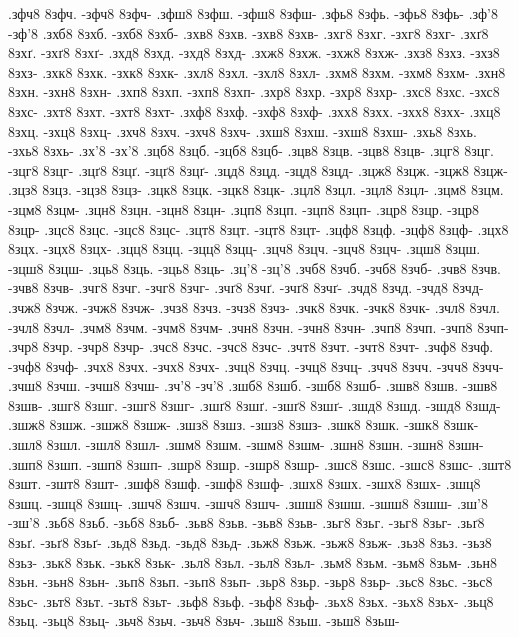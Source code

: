 {.зфч8 8зфч. -зфч8 8зфч-
.зфш8 8зфш. -зфш8 8зфш-
.зфь8 8зфь. -зфь8 8зфь-
.зф'8 -зф'8
.зхб8 8зхб. -зхб8 8зхб-
.зхв8 8зхв. -зхв8 8зхв-
.зхг8 8зхг. -зхг8 8зхг-
.зхґ8 8зхґ. -зхґ8 8зхґ-
.зхд8 8зхд. -зхд8 8зхд-
.зхж8 8зхж. -зхж8 8зхж-
.зхз8 8зхз. -зхз8 8зхз-
.зхк8 8зхк. -зхк8 8зхк-
.зхл8 8зхл. -зхл8 8зхл-
.зхм8 8зхм. -зхм8 8зхм-
.зхн8 8зхн. -зхн8 8зхн-
.зхп8 8зхп. -зхп8 8зхп-
.зхр8 8зхр. -зхр8 8зхр-
.зхс8 8зхс. -зхс8 8зхс-
.зхт8 8зхт. -зхт8 8зхт-
.зхф8 8зхф. -зхф8 8зхф-
.зхх8 8зхх. -зхх8 8зхх-
.зхц8 8зхц. -зхц8 8зхц-
.зхч8 8зхч. -зхч8 8зхч-
.зхш8 8зхш. -зхш8 8зхш-
.зхь8 8зхь. -зхь8 8зхь-
.зх'8 -зх'8
.зцб8 8зцб. -зцб8 8зцб-
.зцв8 8зцв. -зцв8 8зцв-
.зцг8 8зцг. -зцг8 8зцг-
.зцґ8 8зцґ. -зцґ8 8зцґ-
.зцд8 8зцд. -зцд8 8зцд-
.зцж8 8зцж. -зцж8 8зцж-
.зцз8 8зцз. -зцз8 8зцз-
.зцк8 8зцк. -зцк8 8зцк-
.зцл8 8зцл. -зцл8 8зцл-
.зцм8 8зцм. -зцм8 8зцм-
.зцн8 8зцн. -зцн8 8зцн-
.зцп8 8зцп. -зцп8 8зцп-
.зцр8 8зцр. -зцр8 8зцр-
.зцс8 8зцс. -зцс8 8зцс-
.зцт8 8зцт. -зцт8 8зцт-
.зцф8 8зцф. -зцф8 8зцф-
.зцх8 8зцх. -зцх8 8зцх-
.зцц8 8зцц. -зцц8 8зцц-
.зцч8 8зцч. -зцч8 8зцч-
.зцш8 8зцш. -зцш8 8зцш-
.зць8 8зць. -зць8 8зць-
.зц'8 -зц'8
.зчб8 8зчб. -зчб8 8зчб-
.зчв8 8зчв. -зчв8 8зчв-
.зчг8 8зчг. -зчг8 8зчг-
.зчґ8 8зчґ. -зчґ8 8зчґ-
.зчд8 8зчд. -зчд8 8зчд-
.зчж8 8зчж. -зчж8 8зчж-
.зчз8 8зчз. -зчз8 8зчз-
.зчк8 8зчк. -зчк8 8зчк-
.зчл8 8зчл. -зчл8 8зчл-
.зчм8 8зчм. -зчм8 8зчм-
.зчн8 8зчн. -зчн8 8зчн-
.зчп8 8зчп. -зчп8 8зчп-
.зчр8 8зчр. -зчр8 8зчр-
.зчс8 8зчс. -зчс8 8зчс-
.зчт8 8зчт. -зчт8 8зчт-
.зчф8 8зчф. -зчф8 8зчф-
.зчх8 8зчх. -зчх8 8зчх-
.зчц8 8зчц. -зчц8 8зчц-
.зчч8 8зчч. -зчч8 8зчч-
.зчш8 8зчш. -зчш8 8зчш-
.зч'8 -зч'8
.зшб8 8зшб. -зшб8 8зшб-
.зшв8 8зшв. -зшв8 8зшв-
.зшг8 8зшг. -зшг8 8зшг-
.зшґ8 8зшґ. -зшґ8 8зшґ-
.зшд8 8зшд. -зшд8 8зшд-
.зшж8 8зшж. -зшж8 8зшж-
.зшз8 8зшз. -зшз8 8зшз-
.зшк8 8зшк. -зшк8 8зшк-
.зшл8 8зшл. -зшл8 8зшл-
.зшм8 8зшм. -зшм8 8зшм-
.зшн8 8зшн. -зшн8 8зшн-
.зшп8 8зшп. -зшп8 8зшп-
.зшр8 8зшр. -зшр8 8зшр-
.зшс8 8зшс. -зшс8 8зшс-
.зшт8 8зшт. -зшт8 8зшт-
.зшф8 8зшф. -зшф8 8зшф-
.зшх8 8зшх. -зшх8 8зшх-
.зшц8 8зшц. -зшц8 8зшц-
.зшч8 8зшч. -зшч8 8зшч-
.зшш8 8зшш. -зшш8 8зшш-
.зш'8 -зш'8
.зьб8 8зьб. -зьб8 8зьб-
.зьв8 8зьв. -зьв8 8зьв-
.зьг8 8зьг. -зьг8 8зьг-
.зьґ8 8зьґ. -зьґ8 8зьґ-
.зьд8 8зьд. -зьд8 8зьд-
.зьж8 8зьж. -зьж8 8зьж-
.зьз8 8зьз. -зьз8 8зьз-
.зьк8 8зьк. -зьк8 8зьк-
.зьл8 8зьл. -зьл8 8зьл-
.зьм8 8зьм. -зьм8 8зьм-
.зьн8 8зьн. -зьн8 8зьн-
.зьп8 8зьп. -зьп8 8зьп-
.зьр8 8зьр. -зьр8 8зьр-
.зьс8 8зьс. -зьс8 8зьс-
.зьт8 8зьт. -зьт8 8зьт-
.зьф8 8зьф. -зьф8 8зьф-
.зьх8 8зьх. -зьх8 8зьх-
.зьц8 8зьц. -зьц8 8зьц-
.зьч8 8зьч. -зьч8 8зьч-
.зьш8 8зьш. -зьш8 8зьш-
}
